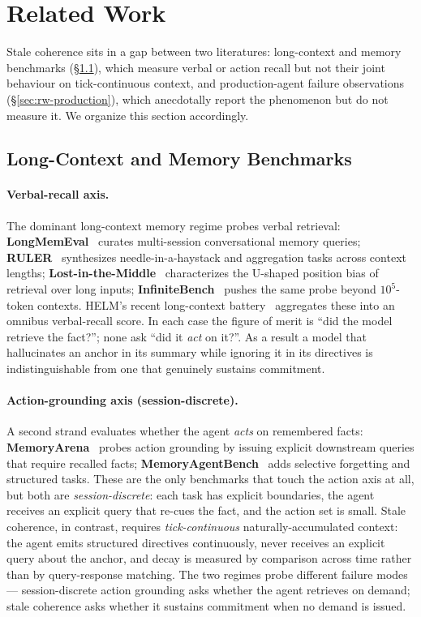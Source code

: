 \section{Related Work}
\label{sec:related-work}

Stale coherence sits in a gap between two literatures: long-context and
memory benchmarks (\S\ref{sec:rw-memory}), which measure verbal or action
recall but not their joint behaviour on tick-continuous context, and
production-agent failure observations (\S\ref{sec:rw-production}), which
anecdotally report the phenomenon but do not measure it. We organize this
section accordingly.

\subsection{Long-Context and Memory Benchmarks}
\label{sec:rw-memory}

\paragraph{Verbal-recall axis.}
The dominant long-context memory regime probes verbal retrieval:
\textbf{LongMemEval}~\citep{Wu2025LongMemEval} curates multi-session
conversational memory queries; \textbf{RULER}~\citep{Hsieh2024RULER}
synthesizes needle-in-a-haystack and aggregation tasks across context lengths;
\textbf{Lost-in-the-Middle}~\citep{Liu2024LostInMiddle} characterizes the
U-shaped position bias of retrieval over long inputs;
\textbf{InfiniteBench}~\citep{Zhang2024InfiniteBench} pushes the same probe
beyond $10^5$-token contexts. HELM's recent long-context
battery~\citep{Stanford2025HELMLong} aggregates these into an omnibus
verbal-recall score. In each case the figure of merit is ``did the model
retrieve the fact?''; none ask ``did it \emph{act} on it?''. As a result a
model that hallucinates an anchor in its summary while ignoring it in its
directives is indistinguishable from one that genuinely sustains commitment.

\paragraph{Action-grounding axis (session-discrete).}
A second strand evaluates whether the agent \emph{acts} on remembered facts:
\textbf{MemoryArena}~\citep{He2026MemoryArena} probes action grounding by
issuing explicit downstream queries that require recalled facts;
\textbf{MemoryAgentBench}~\citep{Hu2025MemoryAgentBench} adds selective
forgetting and structured tasks. These are the only benchmarks that touch the
action axis at all, but both are \emph{session-discrete}: each task has
explicit boundaries, the agent receives an explicit query that re-cues the
fact, and the action set is small. Stale coherence, in contrast, requires
\emph{tick-continuous} naturally-accumulated context: the agent emits
structured directives continuously, never receives an explicit query about
the anchor, and decay is measured by comparison across time rather than by
query-response matching. The two regimes probe different failure modes ---
session-discrete action grounding asks whether the agent retrieves on demand;
stale coherence asks whether it sustains commitment when no demand is issued.

